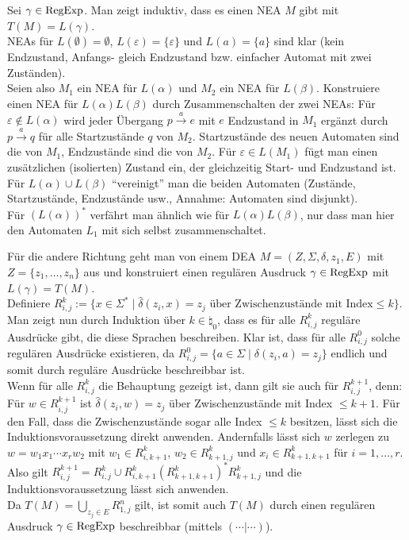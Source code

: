 \begin{Beweis}
    Sei $\gamma \in \text{RegExp}$.
    Man zeigt induktiv, dass es einen NEA $M$ gibt mit $T(M) = L(\gamma)$.\\
    NEAs für $L(\emptyset) = \emptyset$,
    $L(\varepsilon) = \{\varepsilon\}$ und $L(a) = \{a\}$ sind klar
    (kein Endzustand, Anfangs- gleich Endzustand bzw.
    einfacher Automat mit zwei Zuständen).\\
    Seien also $M_1$ ein NEA für $L(\alpha)$ und $M_2$ ein NEA für $L(\beta)$.
    Konstruiere einen NEA für $L(\alpha)L(\beta)$ durch
    Zusammenschalten der zwei NEAs:
    Für $\varepsilon \notin L(\alpha)$ wird jeder Übergang
    $p \xrightarrow{a} e$ mit $e$ Endzustand in $M_1$ ergänzt durch
    $p \xrightarrow{a} q$ für alle Startzustände $q$ von $M_2$.
    Startzustände des neuen Automaten sind die von $M_1$,
    Endzustände sind die von $M_2$.
    Für $\varepsilon \in L(M_1)$ fügt man einen zusätzlichen (isolierten)
    Zustand ein, der gleichzeitig Start- und Endzustand ist.\\
    Für $L(\alpha) \cup L(\beta)$ "`vereinigt"' man die beiden Automaten
    (Zustände, Startzustände, Endzustände usw.,
    Annahme: Automaten sind disjunkt).\\
    Für $(L(\alpha))^\ast$ verfährt man ähnlich wie für
    $L(\alpha)L(\beta)$, nur dass man hier den Automaten $L_1$ mit sich selbst
    zusammenschaltet.
    
    Für die andere Richtung geht man von einem DEA
    $M = (Z, \Sigma, \delta, z_1, E)$ mit $Z = \{z_1, \dotsc, z_n\}$ aus
    und konstruiert einen regulären Ausdruck $\gamma \in \text{RegExp}$ mit
    $L(\gamma) = T(M)$.\\
    Definiere $R_{i,j}^k := \{x \in \Sigma^\ast \;|\;
    \widehat{\delta}(z_i, x) = z_j \text{ über Zwischenzustände mit Index}
    \le k\}$.\\
    Man zeigt nun durch Induktion über $k \in \natural_0$,
    dass es für alle $R_{i,j}^k$
    reguläre Ausdrücke gibt, die diese Sprachen beschreiben.
    Klar ist, dass für alle $R_{i,j}^0$ solche regulären Ausdrücke existieren,
    da
    $R_{i,j}^0 = \{a \in \Sigma \;|\; \delta(z_i, a) = z_j\}$ endlich
    und somit durch reguläre Ausdrücke beschreibbar ist.\\
    Wenn für alle $R_{i,j}^k$ die Behauptung gezeigt ist,
    dann gilt sie auch für $R_{i,j}^{k+1}$, denn:\\
    Für $w \in R_{i,j}^{k+1}$ ist $\widehat{\delta}(z_i, w) = z_j$ über
    Zwischenzustände mit Index $\le k + 1$.
    Für den Fall, dass die Zwischenzustände sogar alle Index $\le k$ besitzen,
    lässt sich die Induktionsvoraussetzung direkt anwenden.
    Andernfalls lässt sich $w$ zerlegen zu $w = w_1 x_1 \dotsb x_r w_2$
    mit $w_1 \in R_{i,k+1}^k$, $w_2 \in R_{k+1,j}^k$ und
    $x_i \in R_{k+1,k+1}^k$ für $i = 1, \dotsc, r$.
    Also gilt $R_{i,j}^{k+1} = R_{i,j}^k \cup
    R_{i,k+1}^k (R_{k+1,k+1}^k)^\ast R_{k+1,j}^k$
    und die Induktionsvoraussetzung lässt sich anwenden.\\
    Da $T(M) = \bigcup_{z_j \in E} R_{1,j}^n$ gilt, ist somit auch
    $T(M)$ durch einen regulären Ausdruck $\gamma \in \text{RegExp}$ beschreibbar
    (mittels $(\dotsb|\dotsb)$).
\end{Beweis}

